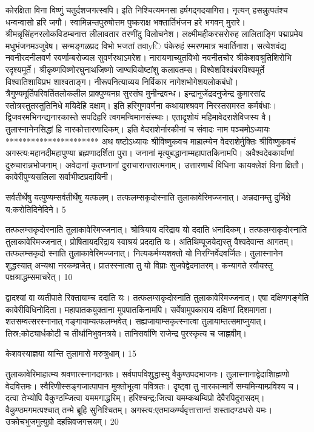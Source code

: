 कोरक्षिता विना विष्णुं चतुर्दशजगत्स्वपि।
 इति निश्चित्यमनसा हर्षगद्गदयागिरा।
 नृत्यन् हसन्नुत्पतंश्च धन्वन्वासो हरि जगौ।
 स्वामिन्नन्तपुरुषोत्तम पुष्कराक्ष
भक्तार्तिभंजन हरे भगवन् मुरारे।
 श्रीमन्नृसिंहनरलोकविडम्बनात्त
लीलावतार तरणींदु विलोचनेश।
 लक्ष्मीमहीकरसरोरुह लालिताङ्गि
पद्माप्रमेय मधुभंजनमञ्जुवेष।
 सन्मङ्गळप्रद विभो भजतां तवाyि
पंकेरुहं स्मरणमात्र भवार्तिनाश।
 सत्येशवंद्य नवनीरदनीलवर्ण
स्वर्णाम्बरोज्वल सुवर्णरथाऽमरेश।
 नारायणाच्युतविभो नवनीतचोर
श्रीकेशवश्रुतिशिरोभि रदृश्यमूर्ते।
 श्रीकृष्णविष्णोरघुनाथजिष्णो
जाण्ववियोष्टांशु कलावतम्स।
 विश्वेशविश्वंबरविश्वमूर्ते
विश्वातिशायिप्रभ शाश्वताङ्ग।
 नीरूपनित्याव्यय निर्विकार
नागेशभोगेशयलोकबंधो।
 त्रैगुण्यमूर्तिपरिवर्तितलोकलील
प्राक्पुण्यनम्र सुरसंघ मुनीन्द्रवन्ध।
 इन्द्रानुजेंद्रदनुजेन्द्र कुमारसांद्र
स्तोत्रस्तुतस्तुतिनिधे मयिदेहि दक्षाम्।
 इति हरिगुणवर्णना कथायाश्श्रवण
निरस्तसमस्त कर्मबंधाः।
 द्विजवरमभिनन्द्यनारकास्ते
सपदिहरि त्वगमन्विमानसंस्थाः।
 एतादृशोयं महिमावेदराशेविजस्य वै।
 तुलास्नानेनसिद्धां हि नारकोत्तारणादिकम्।
 इति वेदराशेर्नारकीनां च संवादः नाम
पञ्चमोऽध्यायः
**********************
अथ षष्टोऽध्यायः श्रीविष्णुकवच माहात्म्येन वेदराशेर्मुक्तिः
श्रीविष्णुकवचं अगस्त्य:महानदीमहापुण्या ब्रह्मणादर्शिता पुरा।
 जनानां मृत्युबद्धानाम्महापातकिनामपि।
 अवैश्वदेवकार्याणां दुरुचारान्नभोजनाम्।
 अवेदानां कृतघ्नानां दुराचारान्तरात्मनाम्।
 उत्तारणार्थं विधिना कायक्लेशं विना क्षितौ।
 कावेरीपुण्यसलिला सर्वाभीष्टप्रदायिनी।
 
सर्वतीर्थेषु यत्पुण्यम्सर्वतीर्थेषु यत्फलम्।
 तत्फलम्सकृदोस्नाति तुलाकावेरिमज्जनात्।
 अन्नदानम्तु दुर्भिक्षे य:करोतिदिनेदिने।
 5

  तत्फलम्सकृदोस्नाति तुलाकावेरिमज्जनात्।
 श्रोत्रियाय दरिद्राय यो ददाति धनादिकम्।
 तत्फलम्सकृदोस्नाति तुलाकावेरिमज्जनात्।
 प्रोषितायदरिद्राय स्वाश्रयं प्रददाति यः।
 अतिथिम्पूजयेद्यस्तु वैश्वदेवान्त आगतम्।
 तत्फलम्सकृदो स्नाति तुलाकावेरिमज्जनात्।
 नित्यकर्मण्यशक्तो यो निरग्निर्वेदवर्जितः।
 तुलास्नानेन शुद्धस्यात् अन्यथा नरकम्व्रजेत्।
 प्रातस्स्नात्वा तु यो विप्राः सुजपेद्वेदमातरम्।
 कन्यागते रवौयस्तु पक्षश्राद्धम्समाचरेत्।
 10

  द्वादश्यां वा व्यतीपाते रिक्तायाम्च ददाति यः।
 तत्फलम्सकृदोस्नाति तुलाकावेरिमज्जनात्।
 एषा दक्षिणगङ्गेति कावेरीविधिनोदिता।
 महापातकयुक्ताना मुपपातकिनामपि।
 सर्वेषामुपकाराय दक्षिणां दिशमागता।
 शतसम्वत्सरस्नानात् गङ्गायाम्यत्फलम्भवेत्।
 सह्यजायाम्सकृत्स्नात्वा तुलायाम्तत्समाप्नुयात्।
 तिस्र:कोट्यार्धकोटी च तीर्थानिभुवनत्रये।
 तानिसर्वाणि राजेन्द्र पुरस्कृत्य च जाह्नवीम्।
 
केशवस्याज्ञया यान्ति तुलामासे मरुत्रुधाम्।
 15

  तुलाकावेरिमाहात्म्य श्रवणात्स्नानदानतः।
 सर्वपापविशुद्धास्यु वैकुण्ठपदभाजनः।
 तुलास्नानाद्वेदाशिाह्मणो वेदवित्तमः।
 स्वैरिणीस्सङ्गजात्पापान मुक्तोभूत्वा पवित्रतः।
 दृष्ट्वा तु नारकान्मार्गे सम्यमिन्याम्प्रविश्य च।
 दत्वा तेभ्योपि वैकुण्ठम्जित्वा यममगाद्धरिम्।
 हरिश्चन्द्र:जित्वा यमम्कथम्विप्रो देवैरपिदुरासदम्।
 वैकुण्ठमगमत्पश्चात् तन्मे ब्रूहि सुनिश्चितम्।
 अगस्त्य:एतमाकर्ण्यवृत्तात्तान्तं शस्तादण्डधरो यमः।
 उक्रोचभुजमुत्युग्रो दहन्निवजगत्त्रयम्।
 20

